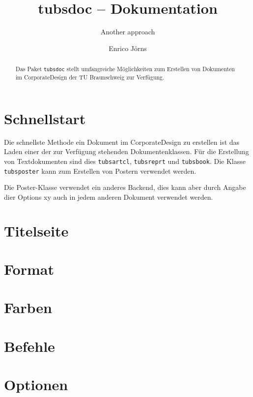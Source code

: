 \documentclass[a4paper,11pt]{scrartcl}
\title{tubsdoc -- Dokumentation}
\author{Enrico Jörns}
\subtitle{Another approach}
\begin{document}
\maketitle


\begin{abstract}
  Das Paket \lstinline{tubsdoc} stellt umfangreiche Möglichkeiten zum Erstellen
  von Dokumenten im CorporateDesign der TU Braunschweig zur Verfügung.
\end{abstract}

\newcommand{\newdocumentclass}[1]{\textcolor{tuRed}{\lstinline{#1}}}

\section{Schnellstart}

Die schnellste Methode ein Dokument im CorporateDesign zu erstellen ist
das Laden einer der zur Verfügung stehenden Dokumentenklassen.
Für die Erstellung von Textdokumenten sind dies \newdocumentclass{tubsartcl},
\newdocumentclass{tubsreprt} und \newdocumentclass{tubsbook}.
Die Klasse \newdocumentclass{tubsposter} kann zum Erstellen von Postern verwendet werden.


Die Poster-Klasse verwendet ein anderes Backend, dies kann aber durch Angabe
dier Options xy auch in jedem anderen Dokument verwendet werden.

\section{Titelseite}

\section{Format}

\section{Farben}

\section{Befehle}

\section{Optionen}
\end{document}
